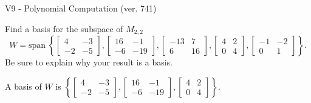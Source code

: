 \begin{exercise}
  \begin{exerciseTitle}V9 - Polynomial Computation (ver. 741)\end{exerciseTitle}
  \begin{exerciseStatement}
    Find a basis for the subspace of \(M_{2,2}\) 
\[W=\mathrm{span}\ \left\{\left[\begin{array}{cc}
4 & -3 \\
-2 & -5
\end{array}\right] , \left[\begin{array}{cc}
16 & -1 \\
-6 & -19
\end{array}\right] , \left[\begin{array}{cc}
-13 & 7 \\
6 & 16
\end{array}\right] , \left[\begin{array}{cc}
4 & 2 \\
0 & 4
\end{array}\right] , \left[\begin{array}{cc}
-1 & -2 \\
0 & 1
\end{array}\right]\right\}.\]
 Be sure to explain why your result is a basis.


  \end{exerciseStatement}
  \begin{exerciseAnswer}
   A basis of \(W\) is  \(\left\{\left[\begin{array}{cc}
4 & -3 \\
-2 & -5
\end{array}\right] , \left[\begin{array}{cc}
16 & -1 \\
-6 & -19
\end{array}\right] , \left[\begin{array}{cc}
4 & 2 \\
0 & 4
\end{array}\right]\right\}\).
  


  \end{exerciseAnswer}
\end{exercise}